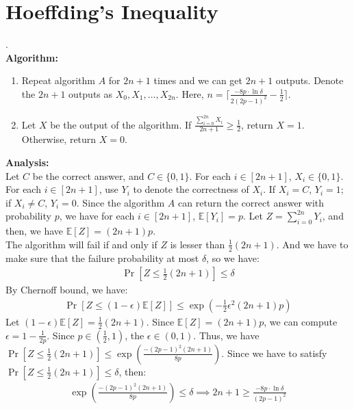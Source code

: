 \section{Hoeffding's Inequality}
.  \\
\textbf{Algorithm:}\\
\begin{enumerate}
    \item  Repeat algorithm $A$ for $2n+1$ times and we can get $2n+1$ outputs.
    Denote the $2n+1$ outputs as $X_0,X_1,...,X_{2n}$. Here, $n=\lceil \frac{-8p\cdot \ln \delta }{2(2p-1)^2} -\frac{1}{2}\rceil $.
    \item Let $X$ be the output of the algorithm. 
    If $\frac{\sum_{i=0}^{2n}X_i}{2n+1}\ge \frac{1}{2}$, return $X=1$. Otherwise, return $X=0$.
\end{enumerate}
\textbf{Analysis:}\\
Let $C$ be the correct answer, and $C\in\{0,1\}$.
For each $i\in [2n+1]$, $X_i\in \{0, 1\}$. 
For each $i\in [2n+1]$, use $Y_i$ to denote the correctness of $X_i$.
If $X_i=C$, $Y_i=1$; if $X_i\neq C$, $Y_i=0$. 
Since the algorithm $A$ can return the correct answer with probability $p$, 
we have for each $i \in [2n+1]$, $\mathbb{E}[Y_i]=p$.
Let $Z=\sum_{i=0}^{2n}Y_i$, and then, we have $\mathbb{E}[Z]=(2n+1)p$.\\
The algorithm will fail if and only if $Z$ is lesser than $\frac{1}{2}(2n+1)$. 
And we have to make sure that the failure probability at most $\delta$, so we have:
\begin{align}
    \nonumber  \Pr[Z\le\frac{1}{2}(2n+1)]\le \delta
\end{align}
By Chernoff bound, we have:
\begin{align}
    \nonumber \Pr[Z \le (1-\epsilon) \mathbb{E}[Z]]\le \exp({-\frac{1}{2}\epsilon^2(2n+1)p})
\end{align}
Let $(1-\epsilon) \mathbb{E}[Z]= \frac{1}{2}(2n+1)$. Since $\mathbb{E}[Z]=(2n+1)p$, we can compute $\epsilon=1-\frac{1}{2p}$.
Since $p\in (\frac{1}{2},1)$, the $\epsilon \in (0,1) $.
Thus, we have $\Pr[Z \le \frac{1}{2}(2n+1)]\le \exp({\frac{-(2p-1)^2(2n+1)}{8p}})$.
Since we have to satisfy $\Pr[Z\le\frac{1}{2}(2n+1)]\le \delta$, then:
\begin{align}
    \nonumber \exp({\frac{-(2p-1)^2(2n+1)}{8p}}) \le \delta \implies 2n+1 \ge \frac{-8p\cdot \ln \delta }{(2p-1)^2}
\end{align}
